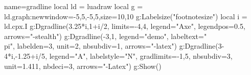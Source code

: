 \begin{luadraw}{name=gradline}
local ld = luadraw
local g = ld.graph:new{window={-5,5,-5,5},size={10,10}}
g:Labelsize("footnotesize")
local i = ld.cpx.I
g:Dgradline({3.25*i,1+i/2}, {limits={-4,4}, legend="Axe", legendpos=0.5, arrows="-stealth"})
g:Dgradline({-3,1}, {legend="demo", labeltext="\\pi", labelden=3, unit=2, nbsubdiv=1, arrows="-latex"})
g:Dgradline({3-4*i,-1.25+i/5}, {legend="A", labelstyle="N", gradlimits={-1,5},
nbsubdiv=3, unit=1.411, nbdeci=3, arrows="-Latex"})
g:Show()
\end{luadraw}
